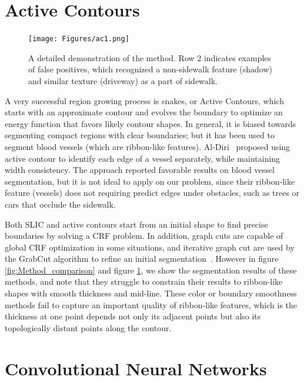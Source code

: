 \section{Active Contours}

\begin{figure}[H]
\centering
\texttt{[image: Figures/ac1.png]}
\caption[Example of Active Contours]{
A detailed demonstration of the \ActiveContours{} method. 
Row 2 indicates examples of false positives, which recognized a non-sidewalk feature 
(shadow) and similar texture (driveway) as a part of sidewalk.}
\label{fig:ac}
\end{figure}

A very successful region growing process is snakes, or Active Contours, which starts with an approximate contour and evolves the boundary to optimize an energy function that favors likely contour shapes. 
In general, it is biased towards segmenting compact regions with clear boundaries; but it has been used to segment blood vessels (which are ribbon-like features). 
Al-Diri~\cite{ActiveContou09} proposed using active contour to identify each edge of a vessel separately, while maintaining width consistency. 
The approach reported favorable results on blood vessel segmentation, but it is not ideal to apply on our problem, 
since their ribbon-like feature (vessels) does not requiring predict edges under obstacles,
 such as trees or cars that occlude the sidewalk.


Both \ac{SLIC} and active contours start from an initial shape to find precise boundaries by solving a \ac{CRF} problem. 
In addition, graph cuts are capable of global \ac{CRF} optimization in some situations, and iterative graph cut are used by the GrabCut algorithm to refine an initial segmentation~\cite{Rother2004-ou}. However in figure \ref{fig:Method_comparison} and figure \ref{fig:ac}, we show the segmentation results of these methods, and note that they struggle to constrain their results to ribbon-like shapes with smooth thickness and mid-line.
These color or boundary smoothness methods fail to capture an important quality of ribbon-like features, which is the thickness at one point depends not only its adjacent points but also its topologically distant points along the contour.

\section{Convolutional Neural Networks}

